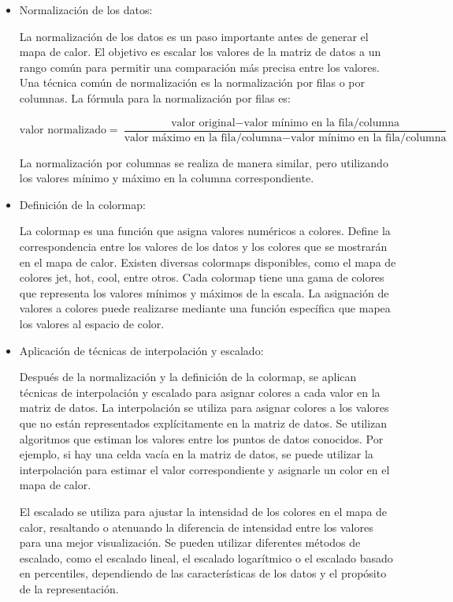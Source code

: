 \documentclass{article}
\begin{document}
\begin{itemize}
\begin{itemize}
\item Normalización de los datos:

La normalización de los datos es un paso importante antes de generar el mapa de calor. El objetivo es escalar los valores de la matriz de datos a un rango común para permitir una comparación más precisa entre los valores. Una técnica común de normalización es la normalización por filas o por columnas. La fórmula para la normalización por filas es:

\begin{equation}
    \textrm{valor normalizado} = \frac{\textrm{valor original} - \textrm{valor mínimo en la fila/columna}}{\textrm{valor máximo en la fila/columna} - \textrm{valor mínimo en la fila/columna}}
\end{equation}

La normalización por columnas se realiza de manera similar, pero utilizando los valores mínimo y máximo en la columna correspondiente.

\item Definición de la colormap:

La colormap es una función que asigna valores numéricos a colores. Define la correspondencia entre los valores de los datos y los colores que se mostrarán en el mapa de calor. Existen diversas colormaps disponibles, como el mapa de colores \textrm{jet}, \textrm{hot}, \textrm{cool}, entre otros. Cada colormap tiene una gama de colores que representa los valores mínimos y máximos de la escala. La asignación de valores a colores puede realizarse mediante una función específica que mapea los valores al espacio de color.

\item Aplicación de técnicas de interpolación y escalado:

Después de la normalización y la definición de la colormap, se aplican técnicas de interpolación y escalado para asignar colores a cada valor en la matriz de datos. La interpolación se utiliza para asignar colores a los valores que no están representados explícitamente en la matriz de datos. Se utilizan algoritmos que estiman los valores entre los puntos de datos conocidos. Por ejemplo, si hay una celda vacía en la matriz de datos, se puede utilizar la interpolación para estimar el valor correspondiente y asignarle un color en el mapa de calor.

El escalado se utiliza para ajustar la intensidad de los colores en el mapa de calor, resaltando o atenuando la diferencia de intensidad entre los valores para una mejor visualización. Se pueden utilizar diferentes métodos de escalado, como el escalado lineal, el escalado logarítmico o el escalado basado en percentiles, dependiendo de las características de los datos y el propósito de la representación.


\end{itemize}
\end{itemize}
\end{document}
